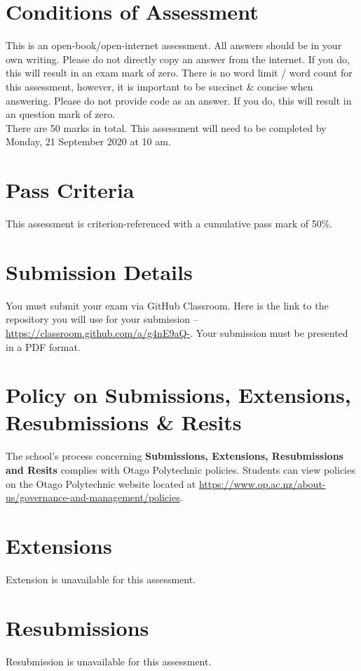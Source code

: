 \documentclass{article}
\begin{document}
\section*{Conditions of Assessment}
This is an open-book/open-internet assessment. All answers should be in your own writing. Please do not directly copy an answer from the internet. If you do, this will result in an exam mark of zero. There is no word limit / word count for this assessment, however, it is important to be succinct \& concise when answering. Please do not provide code as an answer. If you do, this will result in an question mark of zero. \\ 

There are 50 marks in total. This assessment will need to be completed by Monday, 21 September 2020 at 10 am.

\section*{Pass Criteria}
This assessment is criterion-referenced with a cumulative pass mark of 50\%.

\section*{Submission Details}
You must submit your exam via GitHub Classroom. Here is the link to the repository you will use for your submission – \href{https://classroom.github.com/a/g4nE9aQ-}{https://classroom.github.com/a/g4nE9aQ-}. Your submission must be presented in a PDF format. 

\section*{Policy on Submissions, Extensions, Resubmissions \& Resits}
The school's process concerning \textbf{Submissions, Extensions, Resubmissions and Resits} complies with Otago Polytechnic policies. Students can view policies on the Otago Polytechnic website located at \href{https://www.op.ac.nz/about-us/governance-and-management/policies}{https://www.op.ac.nz/about-us/governance-and-management/policies}.

\section*{Extensions}
Extension is unavailable for this assessment. 

\section*{Resubmissions}
Resubmission is unavailable for this assessment.
\end{document}
